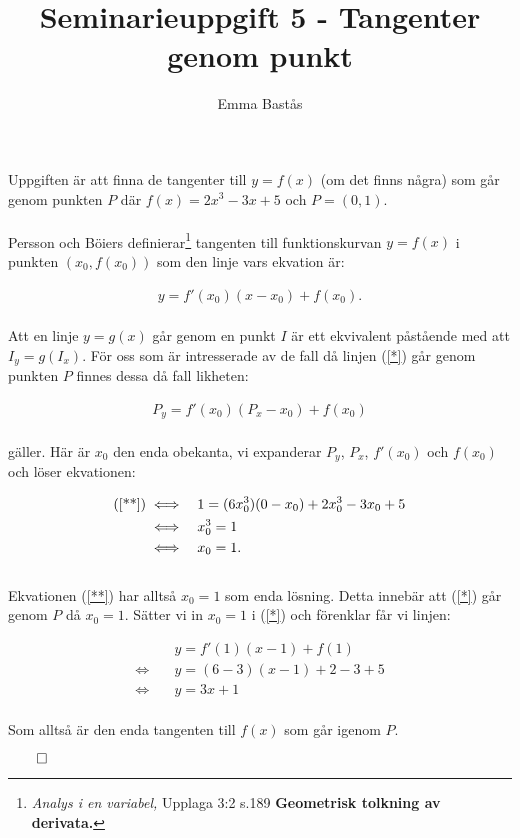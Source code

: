 \documentclass{article}
\title{Seminarieuppgift 5 - Tangenter genom punkt}
\author{Emma Bastås}
\begin{document}
\maketitle

\noindent Uppgiften är att finna de tangenter till $y = f(x)$ (om det finns några) som går genom punkten $P$ där $f(x) = 2x^{3} - 3x + 5$ och $P = (0, 1)$.
\\
\\
Persson och Böiers definierar\footnote{\emph{Analys i en variabel,} Upplaga 3:2 s.189 \textbf{Geometrisk tolkning av derivata.}} tangenten till funktionskurvan $y = f(x)$ i punkten $(x_{0}, f(x_{0}))$ som den linje vars ekvation är:

\begin{gather*}
  y = f'(x_{0})(x - x_{0}) + f(x_{0})\text{.} \label{*}\tag{$\star$}
\end{gather*}
\\
Att en linje $y = g(x)$ går genom en punkt $I$ är ett ekvivalent påstående med att $I_{y} = g(I_{x})$. För oss som är intresserade av de fall då linjen (\ref{*}) går genom punkten $P$ finnes dessa då fall likheten:

\begin{gather*}
  P_{y} = f'(x_{0})(P_{x} - x_{0}) + f(x_{0}) \label{**}\tag{$\star\star$}
\end{gather*}
\\
gäller. Här är $x_{0}$ den enda obekanta, vi expanderar $P_{y}$, $P_{x}$, $f'(x_{0})$ och $f(x_{0})$ och löser ekvationen:

\begin{align*}
  \text{(\ref{**})} \iff \quad & 1 = (6x_{0}^{3})(0 - x_{0}) + 2x_{0}^{3} - 3x_{0} + 5 \\
  \iff \quad & x_{0}^{3} = 1 \\
  \iff \quad & x_{0} = 1\text{.}
\end{align*}
\\
Ekvationen (\ref{**}) har alltså $x_{0} = 1$ som enda lösning. Detta innebär att (\ref{*}) går genom $P$ då $x_{0} = 1$. Sätter vi in $x_{0} = 1$ i (\ref{*}) och förenklar får vi linjen:

\begin{align*}
  & y = f'(1)(x - 1) + f(1) \\
  \iff \quad & y = (6 - 3)(x - 1) + 2 - 3 + 5 \\
  \iff \quad & y = 3x + 1
\end{align*}
\\
Som alltså är den enda tangenten till $f(x)$ som går igenom $P$.

\centerline{$\qed$}
\end{document}
